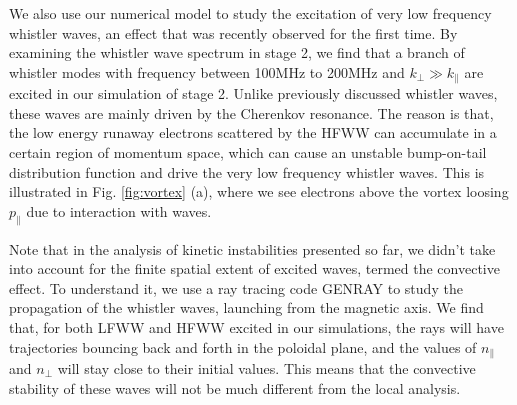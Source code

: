 \documentclass[aps, prl, preprint,english,superscriptaddress]{revtex4-1}
\begin{document}
We also use our numerical model to study the excitation of very low frequency whistler waves, an effect that was recently observed\cite{spong_first_nodate} for the first time. By examining the whistler wave spectrum in stage 2, we find that a branch of whistler modes with frequency between 100MHz to 200MHz and $k_{\perp}\gg k_{\parallel}$ are excited in our simulation of stage 2.
Unlike previously discussed whistler waves, these waves are mainly driven by the Cherenkov resonance. The reason is that, the low energy runaway electrons scattered by the HFWW can accumulate in a certain region of momentum space, which can cause an unstable bump-on-tail distribution function and drive the very low frequency whistler waves. This is illustrated in Fig. \ref{fig:vortex} (a), where we see electrons above the vortex loosing $p_\parallel$ due to interaction with waves. 

Note that in the analysis of kinetic instabilities presented so far, we didn't take into account for the finite spatial extent of excited waves, termed the convective effect\cite{aleynikov_stability_2015}.
To understand it, we use a ray tracing code GENRAY\cite{smirnov_general_1994} to study the propagation of the whistler waves, launching from
the magnetic axis. We find that, for both LFWW and HFWW excited in our simulations,
the rays will have trajectories bouncing back and forth in the poloidal plane, and the values of $n_{\parallel}$ and $n_{\perp}$ will stay close to their initial values. This means that the convective stability of these waves will not be much different from the local analysis.
\end{document}
